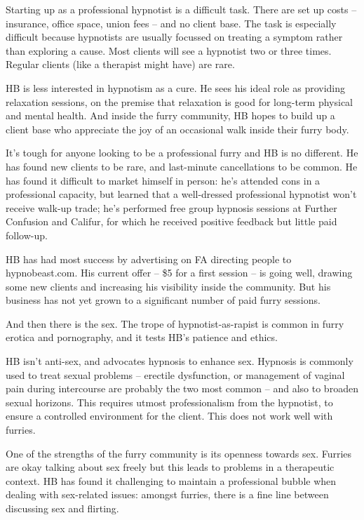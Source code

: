 Starting up as a professional hypnotist is a difficult task. There are set up costs -- insurance, office space, union fees -- and no client base. The task is especially difficult because hypnotists are usually focussed on treating a symptom rather than exploring a cause. Most clients will see a hypnotist two or three times. Regular clients (like a therapist might have) are rare.

HB is less interested in hypnotism as a cure. He sees his ideal role as providing relaxation sessions, on the premise that relaxation is good for long-term physical and mental health. And inside the furry community, HB hopes to build up a client base who appreciate the joy of an occasional walk inside their furry body.

It's tough for anyone looking to be a professional furry and HB is no different. He has found new clients to be rare, and last-minute cancellations to be common. He has found it difficult to market himself in person: he's attended cons in a professional capacity, but learned that a well-dressed professional hypnotist won't receive walk-up trade; he's performed free group hypnosis sessions at Further Confusion and Califur, for which he received positive feedback but little paid follow-up.

HB has had most success by advertising on FA directing people to hypnobeast.com. His current offer -- \$5 for a first session -- is going well, drawing some new clients and increasing his visibility inside the community. But his business has not yet grown to a significant number of paid furry sessions.

And then there is the sex. The trope of hypnotist-as-rapist is common in furry erotica and pornography, and it tests HB's patience and ethics.

HB isn't anti-sex, and advocates hypnosis to enhance sex. Hypnosis is commonly used to treat sexual problems -- erectile dysfunction, or management of vaginal pain during intercourse are probably the two most common -- and also to broaden sexual horizons. This requires utmost professionalism from the hypnotist, to ensure a controlled environment for the client. This does not work well with furries.

One of the strengths of the furry community is its openness towards sex. Furries are okay talking about sex freely but this leads to problems in a therapeutic context. HB has found it challenging to maintain a professional bubble when dealing with sex-related issues: amongst furries, there is a fine line between discussing sex and flirting.

